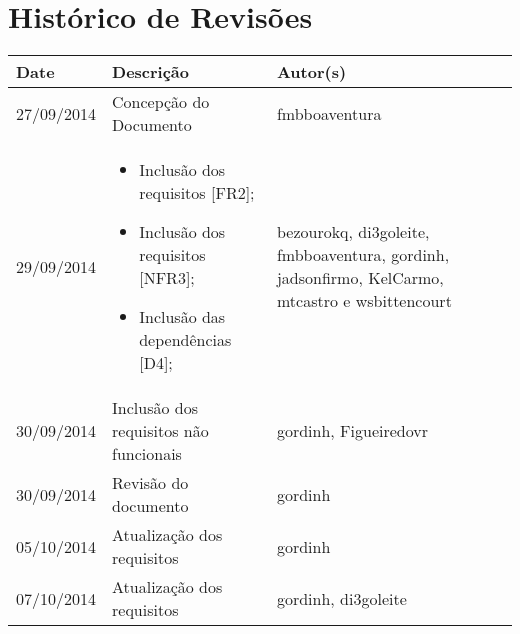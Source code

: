 \documentclass{article}
\begin{document}

\capa
\newpage

\section*{\center Histórico de Revisões}
  \vspace*{1cm}
  \begin{table}[ht]
    \centering
    \begin{tabular}[pos]{|m{2cm} | m{7.2cm} | m{3.8cm}|} 
      \hline
      \cellcolor[gray]{0.9}
      \textbf{Date} & \cellcolor[gray]{0.9}\textbf{Descrição} & \cellcolor[gray]{0.9}\textbf{Autor(s)}\\ \hline
      \hline
      \small 27/09/2014 & \small Concepção do Documento & \small fmbboaventura \\ \hline      
      \small 29/09/2014 &
      \begin{small}
        \begin{itemize}
          \item Inclusão dos requisitos [FR2];
          \item Inclusão dos requisitos [NFR3];
          \item Inclusão das dependências [D4];
        \end{itemize}
      \end{small} & \small bezourokq, di3goleite, fmbboaventura, gordinh, jadsonfirmo, KelCarmo, mtcastro e wsbittencourt \\ \hline 
      \small 30/09/2014 & \small Inclusão dos requisitos não funcionais & \small gordinh, Figueiredovr \\ \hline
      \small 30/09/2014 & \small Revisão do documento & \small gordinh \\ \hline
      \small 05/10/2014 & \small Atualização dos requisitos & \small gordinh \\ \hline
      \small 07/10/2014 & \small Atualização dos requisitos & \small gordinh, di3goleite \\ \hline
    \end{tabular}
  \end{table}

\newpage

\tableofcontents
\newpage
\end{document}
